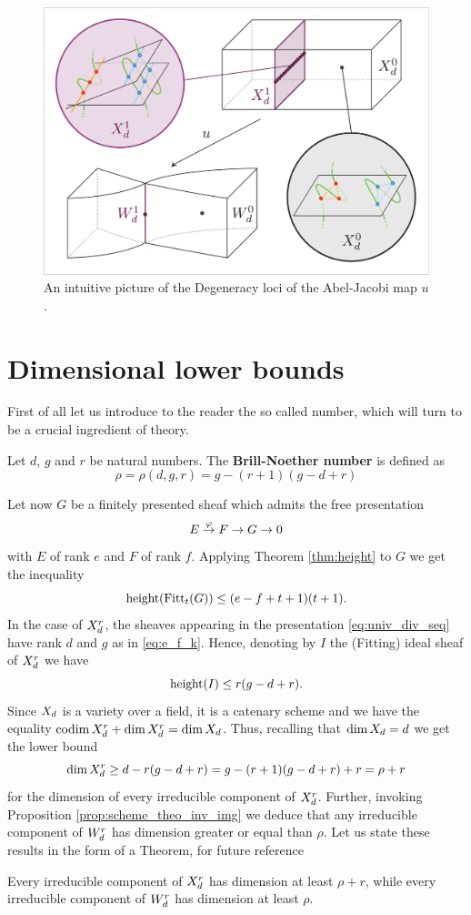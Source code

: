 	\begin{figure}[ht]
		\centering
		\includegraphics[width=\textwidth]{Degeneracy3.pdf}
		\caption{An intuitive picture of the Degeneracy loci of the Abel-Jacobi map $u$.}
	\end{figure}


\section{Dimensional lower bounds}\label{sec:lower_bound}
	First of all let us introduce to the reader the so called \BN number, which will turn to be a crucial ingredient of \BN theory.
	\begin{defi}
		Let $d$, $g$ and $r$ be natural numbers. The \textbf{Brill-Noether number} is defined as
		$$\rho = \rho(d,g,r) = g - (r+1)(g-d+r)$$
	\end{defi}
	\vspace{1em}
	Let now $G$ be a finitely presented sheaf which admits the free presentation
	$$ E\overset{\varphi}\to F \to G\to 0 $$
	with $E$ of rank $e$ and $F$ of rank $f$. Applying Theorem \ref{thm:height} to $G$ we get the inequality
	$$ \operatorname{height} (\operatorname{Fitt}_t(G)) \leq (e-f+t+1)(t+1). $$
	In the case of $X_d^r$, the sheaves appearing in the presentation \eqref{eq:univ_div_seq} have rank $d$ and $g$ as in \eqref{eq:e_f_k}. Hence, denoting by $I$ the (Fitting) ideal sheaf of $X_d^r$ we have
	$$ \operatorname{height} (I) \leq r(g-d+r). $$
	Since $X_d$ is a variety over a field, it is a catenary scheme and we have the equality $ \operatorname{codim} X_d^r + \dim X_d^r = \dim X_d $. Thus, recalling that $\dim X_d = d$ we get the lower bound
	$$ \dim X_d^r \geq d - r(g-d+r) = g-(r+1)(g-d+r) + r = \rho + r $$
	for the dimension of every irreducible component of  $X_d^r$. Further, invoking Proposition \ref{prop:scheme_theo_inv_img} we deduce that any irreducible component of $W_d^r$ has dimension greater or equal than $\rho $. Let us state these results in the form of a Theorem, for future reference
	\begin{theo}\label{thm:lowerbounds}
		Every irreducible component of $X_d^r$ has dimension at least $ \rho + r$, while every irreducible component of $W_d^r$ has dimension at least $ \rho $.
	\end{theo}


